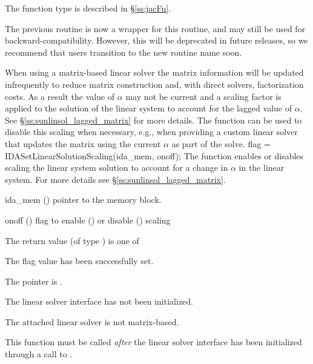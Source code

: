 {{  The function type  is described in \S\ref{ss:jacFn}.

  The previous routine  is now a wrapper for this
  routine, and may still be used for backward-compatibility.  However,
  this will be deprecated in future releases, so we recommend that
  users transition to the new routine name soon.
}
When using a matrix-based linear solver the matrix information will be updated
infrequently to reduce matrix construction and, with direct solvers,
factorization costs. As a result the value of $\alpha$ may not be current and
a scaling factor is applied to the solution of the linear system to account for
the lagged value of $\alpha$. See \S\ref{ss:sunlinsol_lagged_matrix} for more
details. The function  can be used to disable
this scaling when necessary, e.g., when providing a custom linear solver that
updates the matrix using the current $\alpha$ as part of the solve.
{
  flag = IDASetLinearSolutionScaling(ida\_mem, onoff);
}
{
  The function  enables or disables scaling
  the linear system solution to account for a change in $\alpha$ in the linear
  system. For more details see \S\ref{ss:sunlinsol_lagged_matrix}.
}
{
  \begin{args}
  \item[ida\_mem] ()
    pointer to the {\ida} memory block.
  \item[onoff] ()
    flag to enable () or disable () scaling
  \end{args}
}
{
  The return value  (of type ) is one of
  \begin{args}
  \item[\Id{IDALS\_SUCCESS}]
    The flag value has been successfully set.
  \item[\Id{IDALS\_MEM\_NULL}]
    The  pointer is .
  \item[\Id{IDALS\_LMEM\_NULL}]
    The {\idals} linear solver interface has not been initialized.
  \item[\Id{IDALS\_ILL\_INPUT}]
    The attached linear solver is not matrix-based.
  \end{args}
}
{
  This function must be called \emph{after} the {\idals} linear solver
  interface has been initialized through a call to
  .

}}
